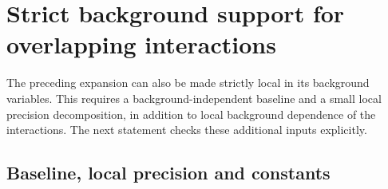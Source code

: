 
\section{Strict background support for overlapping interactions}
\label{ob-section}

The preceding expansion can also be made strictly local in its
background variables. This requires a background-independent baseline
and a small local precision decomposition, in addition to local
background dependence of the interactions. The next statement checks
these additional inputs explicitly.

\subsection{Baseline, local precision and constants}

